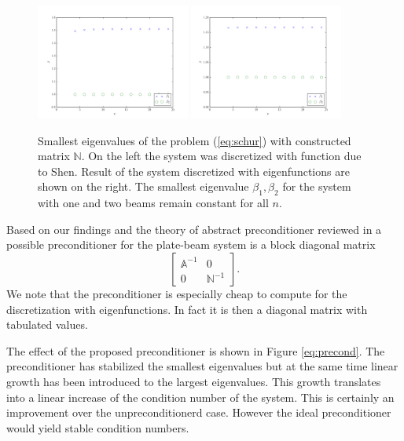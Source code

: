 \documentclass{marine_2015}
\begin{document}
 \begin{figure}[ht]
 \centering
 \includegraphics[width=0.45\textwidth]{img/Schur_precond_shen_cond}
 \includegraphics[width=0.45\textwidth]{img/Schur_precond_sine_cond}\\
 \caption{Smallest eigenvalues of the problem (\ref{eq:schur}) with constructed
 matrix $\mathbb{N}$. On the left the system was discretized with function due
 to Shen. Result of the system discretized with eigenfunctions are shown on the
 right. The smallest eigenvalue $\beta_1, \beta_2$ for the system with one and
 two beams remain constant for all $n$.}
 \label{fig:Schur}
 \end{figure}
Based on our findings and the theory of abstract preconditioner reviewed in
\cite{kent} a possible preconditioner for the plate-beam system is a block
diagonal matrix
\[
    \begin{bmatrix}
      \mathbb{A}^{-1} & 0 \\
      0 & \mathbb{N}^{-1}
    \end{bmatrix}.
\]
We note that the preconditioner is especially cheap to compute for the
discretization with eigenfunctions. In fact it is then a diagonal matrix with
tabulated values.

The effect of the proposed preconditioner is shown in Figure \ref{eq:precond}.
The preconditioner has stabilized the smallest eigenvalues but at the same time 
linear growth has been introduced to the largest eigenvalues. This growth translates 
into a linear increase of the condition number of the system. This is certainly an 
improvement over the unpreconditionerd case. However the ideal preconditioner
would yield stable condition numbers.
\end{document}
